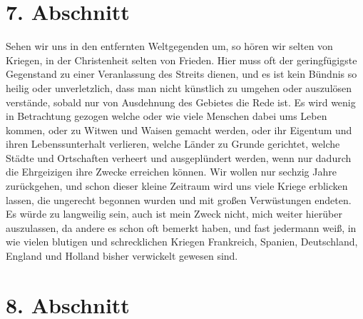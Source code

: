 \section{7. Abschnitt} \label{kap8_ab7}

Sehen wir uns in den entfernten Weltgegenden um, so hören wir selten von
Kriegen, in der Christenheit
selten von Frieden. Hier
muss oft der geringfügigste
Gegenstand zu einer Veranlassung des Streits dienen, und es ist kein Bündnis so
heilig oder unverletzlich, dass man nicht künstlich zu umgehen oder auszulösen
verstände, sobald nur von Ausdehnung des Gebietes die Rede ist. Es wird wenig in
Betrachtung gezogen welche oder wie viele Menschen dabei ums Leben kommen, oder
zu Witwen und Waisen gemacht werden, oder ihr Eigentum und ihren
Lebenssunterhalt verlieren, welche Länder zu Grunde gerichtet, welche Städte und
Ortschaften verheert und ausgeplündert werden, wenn nur dadurch die Ehrgeizigen
ihre Zwecke erreichen können. Wir wollen nur sechzig Jahre zurückgehen, und
schon dieser kleine Zeitraum wird uns viele Kriege erblicken
lassen, die
ungerecht begonnen wurden und mit großen Verwüstungen endeten. Es würde zu
langweilig sein, auch ist mein Zweck nicht, mich weiter hierüber auszulassen, da
andere es schon oft bemerkt haben, und fast jedermann weiß, in wie vielen
blutigen und schrecklichen Kriegen Frankreich,
Spanien, Deutschland,
England und
Holland bisher verwickelt gewesen sind.

\section{8. Abschnitt} \label{kap8_ab8}

